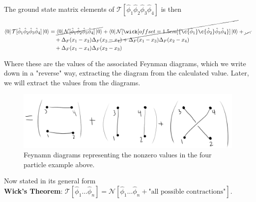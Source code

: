 \noindent The ground state matrix elements of $\mathcal{T}[\hat{\phi}_1 \hat{\phi}_2 \hat{\phi}_3 \hat{\phi}_4]$ is then
\begin{align*}
\bra{0} \mathcal{T}[\hat{\phi}_1 \hat{\phi}_2 \hat{\phi}_3 \hat{\phi}_4] \ket{0} &= \cancel{\bra{0} \mathcal{N}[\hat{\phi}_1 \hat{\phi}_2 \hat{\phi}_3 \hat{\phi}_4] \ket{0}} + \cancel{\bra{0} \mathcal{N}[\wick[offset=1.5em]{\c {\hat{\phi}_1} \c {\hat{\phi}_2} \hat{\phi}_3 \hat{\phi}_4}] \ket{0}} + \cancel{\dots} \\
&\,\,\,\,\,\, + \Delta_F(x_1-x_2)\Delta_F(x_3-x_4) + \Delta_F(x_1-x_3)\Delta_F(x_2-x_4) \\
&\,\,\,\,\,\, + \Delta_F(x_1-x_4)\Delta_F(x_2-x_3)
\end{align*}

\noindent Where these are the values of the associated Feynman diagrams, which we write down in a "reverse" way, extracting the diagram from the calculated value. Later, we will extract the values from the diagrams.

\begin{figure}[H]
	\centering
	\includegraphics[scale=0.5]{feynman1.png}
	\caption{Feynamn diagrams representing the nonzero values in the four particle example above.}
\end{figure}

\noindent Now stated in its general form \\

\noindent \textbf{Wick's Theorem}: $\mathcal{T}[\hat{\phi}_1 \dots \hat{\phi}_n] = \mathcal{N}[\hat{\phi}_1 \dots \hat{\phi}_n + \text{"all possible contractions"}]$. \\

